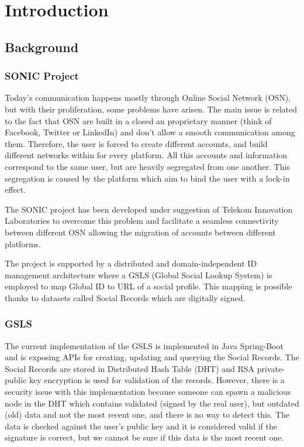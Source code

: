 \chapter{Introduction}
\label{introduction}

\section{Background}
\subsection{SONIC Project}
Today’s communication happens mostly through Online Social Network (OSN), but with their proliferation, some problems have arisen. The main issue is related to the fact that OSN are built in a closed an proprietary manner (think of Facebook, Twitter or LinkedIn) and don’t allow a smooth  communication among them. Therefore, the user is forced to create different accounts, and build different networks within for every platform. All this accounts and information correspond to the same user, but are heavily segregated from one another. This segregation is caused by the platform which aim to bind the user with a lock-in effect.

The SONIC project has been developed under suggestion of Telekom Innovation Laboratories to overcome this problem and facilitate a seamless connectivity between different OSN \citep{gondor2014sonic} allowing the migration of accounts between different platforms.

The project is supported by a distributed and domain-independent ID management architecture where a GSLS (Global Social Lookup System) is employed to map Global ID to URL of a social profile. This mapping is possible thanks to datasets called Social Records which are digitally signed.

\subsection{GSLS}
The current implementation of the GSLS is implemented in Java Spring-Boot and is exposing APIs for creating, updating and  querying the Social Records. The Social Records are stored in  Distributed Hash Table (DHT) and RSA private-public key encryption is used for validation of the records. However, there is a security issue with this implementation because someone can spawn a malicious node in the DHT which contains validated (signed by the real user), but outdated (old) data and not the most recent one, and there is no way to detect this. The data is checked against the user’s public key and it is considered valid if the signature is correct, but we cannot be sure if this data is the most recent one.


